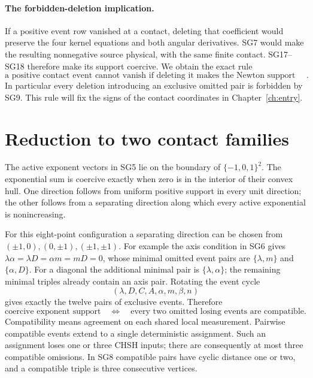 \paragraph{The forbidden-deletion implication.}
If a positive event row vanished at a contact, deleting that
coefficient would preserve the four kernel equations and both
angular derivatives.  SG7 would make the resulting nonnegative
source physical, with the same finite contact.  SG17--SG18
therefore make its support coercive.  We obtain the exact rule
\[
 \text{a positive contact event cannot vanish if deleting it
 makes the Newton support noncoercive}.                       \tag{SG22}
\]
In particular every deletion introducing an exclusive omitted pair
is forbidden by SG9.  This rule will fix the signs of the contact coordinates in
Chapter~\ref{ch:entry}.

\section{Reduction to two contact families}

The active exponent vectors in SG5 lie on the boundary of
$\{-1,0,1\}^2$.  The exponential sum is coercive exactly when zero
is in the interior of their convex hull.  One direction follows from
uniform positive support in every unit direction; the other follows
from a separating direction along which every active exponential is
nonincreasing.

For this eight-point configuration a separating direction can be
chosen from $(\pm1,0),(0,\pm1),(\pm1,\pm1)$.  For example the axis
condition in SG6 gives
$\lambda\alpha=\lambda D=\alpha m=mD=0$, whose minimal omitted
event pairs are $\{\lambda,m\}$ and $\{\alpha,D\}$.
For a diagonal the additional minimal pair is
$\{\lambda,\alpha\}$; the remaining minimal triples already
contain an axis pair.  Rotating the event cycle
\[
                 (\lambda,D,C,A,\alpha,m,\beta,n)          \tag{SG8}
\]
gives exactly the twelve pairs of exclusive events.  Therefore
\[
 \text{coercive exponent support}\quad\Longleftrightarrow\quad
 \text{every two omitted losing events are compatible}.       \tag{SG9}
\]
Compatibility means agreement on each shared local measurement.
Pairwise compatible events extend to a single deterministic
assignment.  Such an assignment loses one or three CHSH inputs;
there are consequently at most three compatible omissions.
In SG8 compatible pairs have cyclic distance one or two, and a
compatible triple is three consecutive vertices.

